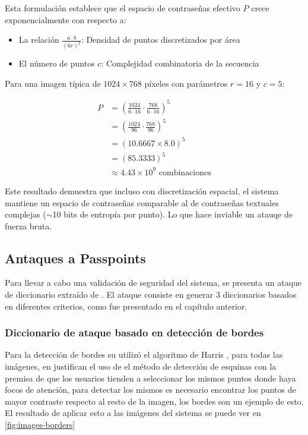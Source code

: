 Esta formulación establece que el espacio de contraseñas efectivo $P$ crece exponencialmente con respecto a:
\begin{itemize}
	\item La relación $\frac{a \cdot b}{(6r)^2}$: Densidad de puntos discretizados por área
	\item El número de puntos $c$: Complejidad combinatoria de la secuencia
\end{itemize}

Para una imagen típica de $1024 \times 768$ píxeles con parámetros $r = 16$ y $c = 5$:

\begin{align*}
	P &= \left( \frac{1024}{6 \cdot 16} \cdot \frac{768}{6 \cdot 16} \right)^5 \\
	&= \left( \frac{1024}{96} \cdot \frac{768}{96} \right)^5 \\
	&= (10.6667 \times 8.0)^5 \\
	&= (85.3333)^5 \\
	&\approx 4.43 \times 10^9 \text{ combinaciones}
\end{align*}

Este resultado demuestra que incluso con discretización espacial, el sistema mantiene un espacio de contraseñas comparable al de contraseñas textuales complejas ($\sim$10 bits de entropía por punto). Lo que hace inviable un atauqe de fuerza bruta.


\subsection{Antaques a Passpoints}
Para llevar a cabo una validaci\'on de seguridad del sistema, se presenta un ataque de diccionario extra\'ido de \cite{van2010purely}. El ataque consiste en generar 3 diccionarios basados en diferentes criterios, como fue presentado en el cap\'itulo anterior.

\subsubsection{Diccionario de ataque basado en detecci\'on de bordes}
Para la detecci\'on de bordes su utiliz\'o el algoritmo de Harris \cite{Harris1988ACC}, para todas las im\'agenes, en \cite{van2010purely} justifican el uso de el m\'etodo de detecci\'on de esquinas con la premisa de que los usuarios tienden a seleccionar los mismos puntos donde haya focos de atenci\'on, para detectar los mismos es necesario encontrar los puntos de mayor contraste respecto al resto de la imagen, los bordes son un ejemplo de esto. El resultado de aplicar esto a las im\'agenes del sistema se puede ver en \ref{fig:images-borders}

